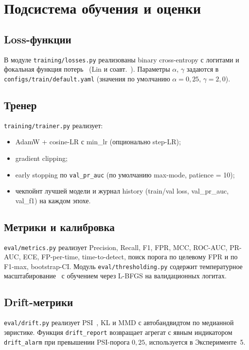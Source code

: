 \documentclass[14pt, a4paper]{extarticle}
\begin{document}
\section{Подсистема обучения и оценки}

\subsection{Loss-функции}

В модуле \texttt{training/losses.py} реализованы binary cross-entropy с
логитами и фокальная функция потерь~ (Lin и
соавт.~\cite{lin2017focal}). Параметры \(\alpha\), \(\gamma\) задаются в
\texttt{configs/train/default.yaml} (значения по умолчанию
\(\alpha = 0{,}25\), \(\gamma = 2{,}0\)).

\subsection{Тренер}

\texttt{training/trainer.py} реализует:
\begin{itemize}
    \item AdamW + cosine-LR с min\_lr (опционально step-LR);
    \item gradient clipping;
    \item early stopping по \texttt{val\_pr\_auc} (по умолчанию max-mode,
    patience = 10);
    \item чекпойнт лучшей модели и журнал history (train/val loss,
    val\_pr\_auc, val\_f1) на каждом эпохе.
\end{itemize}

\subsection{Метрики и калибровка}

\texttt{eval/metrics.py} реализует Precision, Recall, F1, FPR, MCC,
ROC-AUC, PR-AUC, ECE, FP-per-time, time-to-detect, поиск порога по
целевому FPR и по F1-max, bootstrap-CI. Модуль
\texttt{eval/thresholding.py} содержит температурное
масштабирование~\cite{guo2017calibration} с обучением через L-BFGS на
валидационных логитах.

\subsection{Drift-метрики}

\texttt{eval/drift.py} реализует PSI~, KL и MMD с
автобандвидтом по медианной эвристике. Функция \texttt{drift\_report}
возвращает агрегат с явным индикатором \texttt{drift\_alarm} при
превышении PSI-порога \(0{,}25\), используется в Эксперименте~5.
\end{document}
